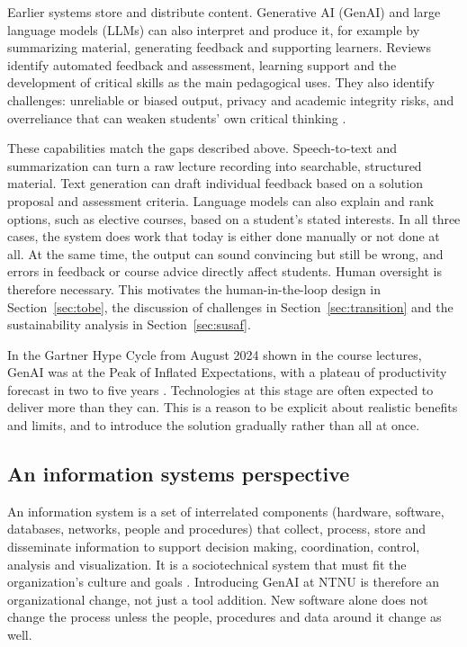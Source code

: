 Earlier systems store and distribute content. Generative AI (GenAI) and large language models (LLMs) can also interpret and produce it, for example by summarizing material, generating feedback and supporting learners. Reviews identify automated feedback and assessment, learning support and the development of critical skills as the main pedagogical uses. They also identify challenges: unreliable or biased output, privacy and academic integrity risks, and overreliance that can weaken students' own critical thinking \parencite{qian2025}.

These capabilities match the gaps described above. Speech-to-text and summarization can turn a raw lecture recording into searchable, structured material. Text generation can draft individual feedback based on a solution proposal and assessment criteria. Language models can also explain and rank options, such as elective courses, based on a student's stated interests. In all three cases, the system does work that today is either done manually or not done at all. At the same time, the output can sound convincing but still be wrong, and errors in feedback or course advice directly affect students. Human oversight is therefore necessary. This motivates the human-in-the-loop design in Section~\ref{sec:tobe}, the discussion of challenges in Section~\ref{sec:transition} and the sustainability analysis in Section~\ref{sec:susaf}.

In the Gartner Hype Cycle from August 2024 shown in the course lectures, GenAI was at the Peak of Inflated Expectations, with a plateau of productivity forecast in two to five years \parencite{toussaint2025}. Technologies at this stage are often expected to deliver more than they can. This is a reason to be explicit about realistic benefits and limits, and to introduce the solution gradually rather than all at once.

\subsection{An information systems perspective}\label{sec:is}

An information system is a set of interrelated components (hardware, software, databases, networks, people and procedures) that collect, process, store and disseminate information to support decision making, coordination, control, analysis and visualization. It is a sociotechnical system that must fit the organization's culture and goals \parencite{toussaint2025}. Introducing GenAI at NTNU is therefore an organizational change, not just a tool addition. New software alone does not change the process unless the people, procedures and data around it change as well.


